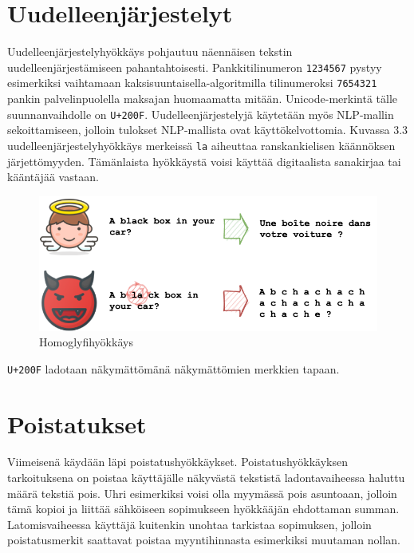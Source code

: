 \section{Uudelleenjärjestelyt}
Uudelleenjärjestelyhyökkäys pohjautuu näennäisen tekstin uudelleenjärjestämiseen pahantahtoisesti. Pankkitilinumeron \texttt{1234567} pystyy esimerkiksi vaihtamaan kaksisuuntaisella-algoritmilla tilinumeroksi \texttt{7654321} pankin palvelinpuolella maksajan huomaamatta mitään. Unicode-merkintä tälle suunnanvaihdolle on \texttt{U+200F}. Uudelleenjärjestelyjä käytetään myös NLP-mallin sekoittamiseen, jolloin tulokset NLP-mallista ovat käyttökelvottomia. Kuvassa 3.3 uudelleenjärjestelyhyökkäys merkeissä \texttt{la} aiheuttaa ranskankielisen käännöksen järjettömyyden. Tämänlaista hyökkäystä voisi käyttää digitaalista sanakirjaa tai kääntäjää vastaan. \citep{boucher2021bad}
\begin{figure}[t]
  \includegraphics[scale=0.599]{figures/reordering.png}
  \caption{Homoglyfihyökkäys \citep{boucher2021bad}}
\end{figure}
\texttt{U+200F} ladotaan näkymättömänä näkymättömien merkkien tapaan.

\section{Poistatukset}

Viimeisenä käydään läpi poistatushyökkäykset. Poistatushyökkäyksen tarkoituksena on poistaa käyttäjälle näkyvästä tekstistä ladontavaiheessa haluttu määrä tekstiä pois. Uhri esimerkiksi voisi olla myymässä pois asuntoaan, jolloin tämä kopioi ja liittää sähköiseen sopimukseen hyökkääjän ehdottaman summan. Latomisvaiheessa käyttäjä kuitenkin unohtaa tarkistaa sopimuksen, jolloin poistatusmerkit saattavat poistaa myyntihinnasta esimerkiksi muutaman nollan.

